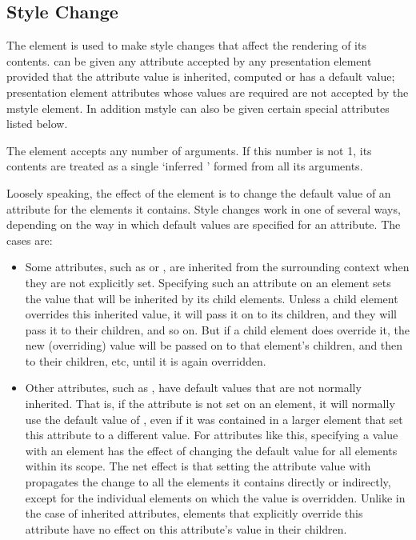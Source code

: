 \subsection{Style Change}\label{sec:style}

The {} element is used to make style changes that affect the
rendering of its contents. {} can be given any attribute accepted
by any {\codeml} presentation element provided that the attribute value is inherited,
computed or has a default value; presentation element attributes whose values are
required are not accepted by the mstyle element. In addition mstyle can also be
given certain special attributes listed below.

The {} element accepts any number of arguments. If this number is
not 1, its contents are treated as a single `inferred {}' formed from
all its arguments.

Loosely speaking, the effect of the {} element is to change the
default value of an attribute for the elements it contains. Style changes work in
one of several ways, depending on the way in which default values are specified
for an attribute.  The cases are:\ 
\begin{itemize}
\item Some attributes, such as {} or
  {\attribute{color}{p-{\codeml}}}, are inherited from the surrounding context when
    they are not explicitly set.  Specifying such an attribute on an
    {\element{cstyle}} element sets the value that will be inherited by its child
    elements. Unless a child element overrides this inherited value, it will pass
    it on to its children, and they will pass it to their children, and so on. But
    if a child element does override it, the new (overriding) value will be passed
    on to that element's children, and then to their children, etc, until it is
    again overridden.
  \item Other attributes, such as {}, have default
    values that are not normally inherited. That is, if the
    {\attribute{variant}{p-{\codeml}}} attribute is not set on an element, it will
    normally use the default value of {\attval{normal}{variant}{p-{\codeml}}},
    even if it was contained in a larger element that set this attribute to a
    different value. For attributes like this, specifying a value with an
    {\element{cstyle}} element has the effect of changing the default value for
    all elements within its scope.  The net effect is that setting the attribute
    value with {\element{cstyle}} propagates the change to all the elements it
    contains directly or indirectly, except for the individual elements on which
    the value is overridden. Unlike in the case of inherited attributes, elements
    that explicitly override this attribute have no effect on this attribute's
    value in their children.
\end{itemize}


